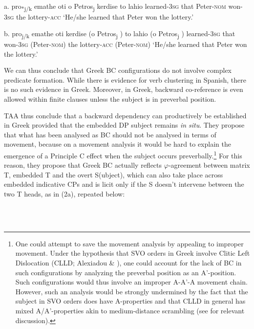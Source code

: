 \documentclass[output=paper]{langsci/langscibook}
\begin{document}
\ea%
    \label{ex:key:25}
    \gll\\
        \\
    \glt
    \z

           a.  pro\textsubscript{*j/k}  emathe   oti   o Petros\textsubscript{j}   kerdise   to lahio           learned{}-\textsc{3sg}   that Peter{}-\textsc{nom}   won{}-\textsc{3sg} the lottery{}-\textsc{acc}            ‘He/she learned that Peter won the lottery.’

b.  pro\textsubscript{j/k}  emathe   oti   kerdise (o Petros\textsubscript{j} ) to lahio (o Petros\textsubscript{j} )          learned{}-\textsc{3sg}    that     won{}-\textsc{3sg} (Peter{}-\textsc{nom}) the lottery{}-\textsc{acc}  (Peter{}-\textsc{nom})        ‘He/she learned that Peter won the lottery.’

We can thus conclude that Greek BC configurations do not involve complex predicate formation. While there is evidence for verb clustering in Spanish, there is no such evidence in Greek. Moreover, in Greek, backward co-reference is even allowed within finite clauses unless the subject is in preverbal position.

TAA thus conclude that a backward dependency can productively be established in Greek provided that the embedded DP subject remains \textit{in situ}. They propose that what has been analysed as BC should not be analysed in terms of movement, because on a movement analysis it would be hard to explain the emergence of a Principle C effect when the subject occurs preverbally.\footnote{One could attempt to save the movement analysis by appealing to improper movement. Under the hypothesis that SVO orders in Greek involve Clitic Left Dislocation (CLLD; Alexiadou \& \citealt{Anagnostopoulou1998}), one could account for the lack of BC in such configurations by analyzing the preverbal position as an A’-position. Such configurations would thus involve an improper A-A’-A movement chain. However, such an analysis would be strongly undermined by the fact that the subject in SVO orders does have A-properties and that CLLD in general has mixed A/A’-properties akin to medium-distance scrambling (see \citealt{Miyagawa2017} for relevant discussion).}  For this reason, they propose that Greek BC actually reflects $\varphi ${}-agreement between matrix T, embedded T and the overt S(ubject), which can also take place across embedded indicative CPs and is licit only if the S doesn’t intervene between the two T heads, as in (2a), repeated below:

\ea%
    \label{ex:key:2}
    \gll\\
        \\
    \glt
    \z
\end{document}
